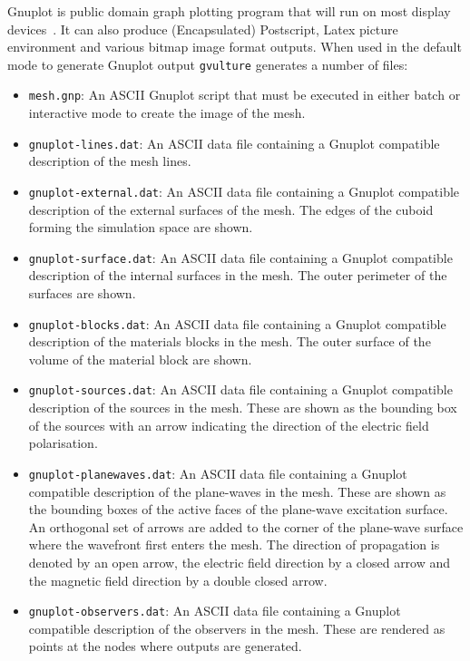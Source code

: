 \documentclass[onecolumn,a4paper]{article}
\numberwithin{equation}{section}
\begin{document}
Gnuplot is public domain graph plotting program that will run on most display devices~\cite{gnuplotweb}. It 
can also produce (Encapsulated) Postscript, Latex picture environment and various bitmap image format outputs.
When used in the default mode to generate Gnuplot output \texttt{gvulture} generates a number of files:
\begin{itemize}
 \item \texttt{mesh.gnp}: An ASCII Gnuplot script that must be executed in either batch or
 interactive mode to create the image of the mesh.
 \item \texttt{gnuplot-lines.dat}: An ASCII data file containing a Gnuplot compatible
 description of the mesh lines.
 \item \texttt{gnuplot-external.dat}: An ASCII data file containing a Gnuplot compatible
 description of the external surfaces of the mesh. The edges of the cuboid forming the
 simulation space are shown.
 \item \texttt{gnuplot-surface.dat}: An ASCII data file containing a Gnuplot compatible
 description of the internal surfaces in the mesh. The outer perimeter of the surfaces
 are shown.
 \item \texttt{gnuplot-blocks.dat}: An ASCII data file containing a Gnuplot compatible
 description of the materials blocks in the mesh. The outer surface of the volume of
 the material block are shown.
 \item \texttt{gnuplot-sources.dat}: An ASCII data file containing a Gnuplot compatible
 description of the sources in the mesh. These are shown as the bounding box of the
 sources with an arrow indicating the direction of the electric field polarisation.
 \item \texttt{gnuplot-planewaves.dat}: An ASCII data file containing a Gnuplot compatible
 description of the plane-waves in the mesh. These are shown as the bounding boxes of the
 active faces of the plane-wave excitation surface. An orthogonal set of arrows are added
 to the corner of the plane-wave surface where the wavefront first enters the mesh. The direction of
 propagation is denoted by an open arrow, the electric field direction by a closed arrow and
 the magnetic field direction by a double closed arrow.
 \item \texttt{gnuplot-observers.dat}: An ASCII data file containing a Gnuplot compatible
 description of the observers in the mesh. These are rendered as points at the
 nodes where outputs are generated.
\end{itemize}
\end{document}

